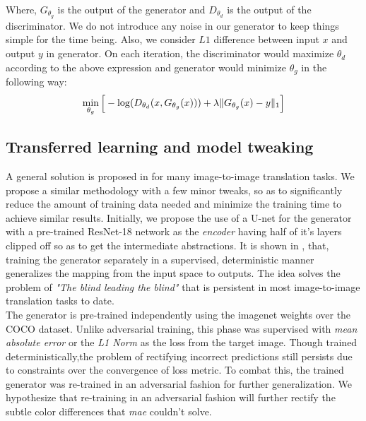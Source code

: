 \documentclass[10pt,twocolumn,letterpaper]{article}
\begin{document}
    Where, $G_{\theta_{g}}$ is the output of the generator and $D_{\theta_d}$ is the output of the discriminator. We do not introduce any noise in our generator to keep things simple for the time being. Also, we consider $L1$ difference between input $x$ and output $y$ in generator. On each iteration, the discriminator would maximize $\theta_d$ according to the above expression and generator would minimize $\theta_g$ in the following way:
        \begin{equation}
            \footnotesize{\min_{\theta_g}\Big[-\log(D_{\theta_d}(x,G_{\theta_g}(x)))+\lambda \Vert G_{\theta_g}(x) - y \Vert_1 \Big]}
    	 \end{equation}
 \subsection{Transferred learning and model tweaking}
    \hspace*{0.167 in}A general solution is proposed in \cite{isola2018imagetoimage} for many image-to-image translation tasks. We propose a similar methodology with a few minor tweaks, so as to significantly reduce the amount of training data needed and minimize the training time to achieve similar results. Initially, we propose the use of a U-net for the generator with a pre-trained ResNet-18 network as the \textit{encoder} having half of it's layers clipped off so as to get the intermediate abstractions. It is shown in \cite{ledig2017photorealistic}, that, training the generator separately in a supervised, deterministic manner generalizes the mapping from the input space to outputs. The idea solves the problem of \textit{"The blind leading the blind"} that is persistent in most image-to-image translation tasks to date. \\
    \hspace*{0.167 in}The generator is pre-trained independently using the imagenet weights over the COCO dataset. Unlike adversarial training, this phase was supervised with \textit{mean absolute error} or the \textit{L1 Norm} as the loss from the target image. Though trained deterministically,the problem of rectifying incorrect predictions still persists due to constraints over the convergence of loss metric. To combat this, the trained generator was re-trained in an adversarial fashion for further generalization. We hypothesize that re-training in an adversarial fashion will further rectify the subtle color differences that \textit{mae} couldn't solve.\\
\end{document}
